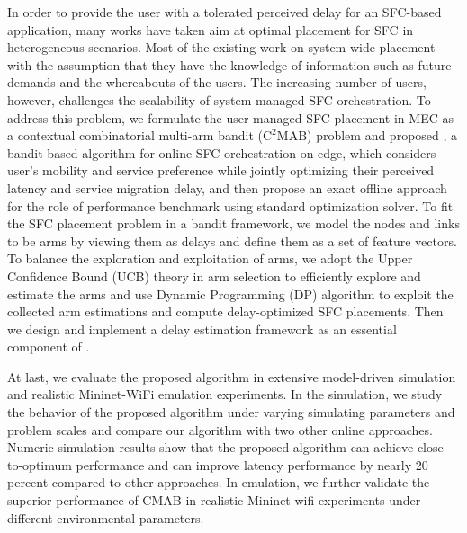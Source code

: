 \documentclass[12pt]{ucalgthes1}
\newcommand{\ccmab}{$\text{C}^2\text{MAB}$}
\newcommand{\myalgorithm}{\textsmaller{\textsf{CHANGE}}}
\begin{document}
In order to provide the user with a tolerated perceived delay for an SFC-based application, many works have taken aim at optimal placement for SFC in heterogeneous scenarios. Most of the existing work on system-wide placement with the assumption that they have the knowledge of information such as future demands and the whereabouts of the users. The increasing number of users, however, challenges the scalability of system-managed SFC orchestration. 
To address this problem, we formulate the user-managed SFC placement in MEC as a contextual combinatorial multi-arm bandit (\ccmab) problem and proposed \myalgorithm, a bandit based algorithm for online SFC orchestration on edge, which considers user’s mobility and service preference while jointly optimizing their perceived latency and service migration delay, and then propose an exact offline approach for the role of performance benchmark using standard optimization solver.
To fit the SFC placement problem in a bandit framework, we model the nodes and links to be arms by viewing them as delays and define them as a set of feature vectors. To balance the exploration and exploitation of arms, we adopt the Upper Confidence Bound (UCB) theory in arm selection to efficiently explore and estimate the arms and use Dynamic Programming  (DP) algorithm to exploit the collected arm estimations and compute delay-optimized SFC placements. 
Then we design and implement a delay estimation framework as an essential component of \myalgorithm.

At last, we evaluate the proposed algorithm in extensive model-driven simulation and realistic Mininet-WiFi emulation experiments. In the simulation, we study the behavior of the proposed algorithm under varying simulating parameters and problem scales and compare our algorithm with two other online approaches. Numeric simulation results show that the proposed algorithm can achieve close-to-optimum performance and can improve latency performance by nearly 20 percent compared to other approaches.
In emulation, we further validate the superior performance of CMAB in realistic Mininet-wifi experiments under different environmental parameters.


%
%
\end{document}
